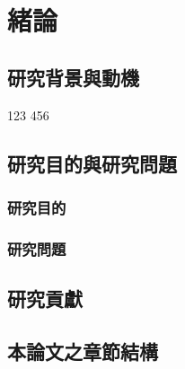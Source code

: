 \chapter{緒論}
\label{cha:intro}

\section{研究背景與動機}
123 \cite{short2017procedural}
456 \cite{test2017}

\section{研究目的與研究問題}

\subsection{研究目的}

\subsection{研究問題}

\section{研究貢獻}

\section{本論文之章節結構}